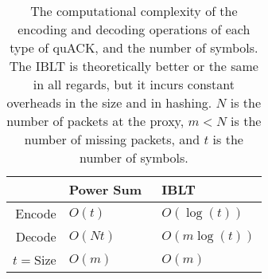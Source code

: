 \begin{table}[t]
    \centering
    \begin{tabular}{r l l}
        \toprule
        \bf & Power Sum~\cite{yuan2024sidekick} & IBLT \\
        \midrule
        Encode & $O(t)$ & $O(\log(t))$ \\
        Decode & $O(Nt)$ & $O(m\log(t))$ \\
        $t=$Size & $O(m)$ & $O(m)$ \\
        \bottomrule
    \end{tabular}
    \caption{The computational complexity of the encoding and decoding
    operations of each type of quACK, and the number of symbols. The IBLT
    is theoretically better or the same in all regards, but it
    incurs constant overheads in the size and in hashing.
    $N$ is the number of packets at the proxy, $m < N$ is the number of
     missing packets, and $t$ is the number of symbols.}
    \label{tab:quack-complexity}
\end{table}